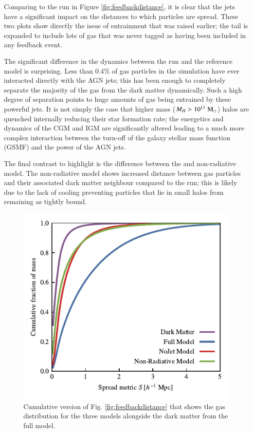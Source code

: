 Comparing to the \nojet{} run in Figure \ref{fig:feedbackdistance}, it is clear
that the jets have a significant impact on the distances to which particles
are spread. These two plots show directly the issue of entrainment that was
raised earlier; the tail is expanded to include lots of gas that was never
tagged as having been included in any feedback event.

The significant difference in the dynamics between the \nojet{} run and the
reference model is surprising. Less than $0.4\%$ of gas particles in the simulation
have ever interacted directly with the AGN jets; this has been enough
to completely separate the majority of the gas from the dark matter dynamically.
Such a high degree of separation points to huge amounts of gas being entrained
by these powerful jets. It is not simply the case that higher mass ($M_H >
10^{11} \;{\rm M}_{\odot}{}$) halos are quenched internally reducing their star formation
rate; the energetics and dynamics of the CGM and IGM are significantly altered
leading to a much more complex interaction between the turn-off of the
galaxy stellar mass function (GSMF) and the power of the AGN jets.

The final contrast to highlight is the difference between the \nojet{} and
non-radiative model. The non-radiative model shows increased distance between
gas particles and their associated dark matter neighbour compared to the
\nojet{} run; this is likely due to the lack of cooling preventing particles
that lie in small halos from remaining as tightly bound.

\begin{figure}
    \centering
    \includegraphics{figures/cumulative_histogram_comparison.pdf}
    \vspace{-0.7cm}
    \caption{Cumulative version of Fig. \ref{fig:feedbackdistance} that
    shows the gas distribution for the three models alongside the dark
    matter from the full model.}
    \label{fig:cumulativehistogram}
\end{figure}

